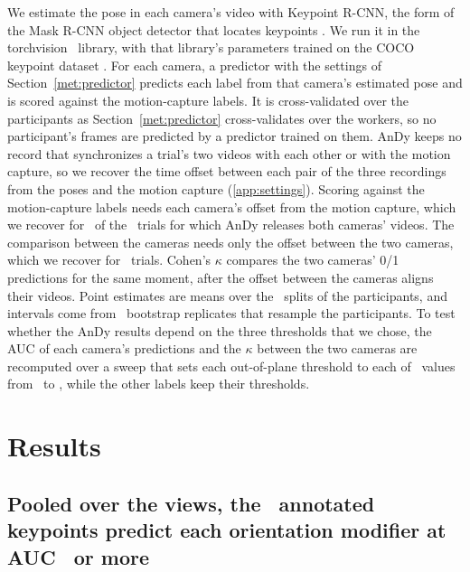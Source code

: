 \documentclass[review,3p,authoryear]{elsarticle}
\begin{document}
We estimate the pose in each camera's video with Keypoint R-CNN, the form of the Mask R-CNN object detector that locates
keypoints \citep{he2017maskrcnn}. We run it in the torchvision \torchvisionVersion\
library, with that library's parameters trained on the COCO keypoint dataset
\citep{lin2014coco}. For each camera, a predictor with the settings of
Section~\ref{met:predictor} predicts each label from that camera's estimated pose and is scored against the
motion-capture labels. It is
cross-validated over the participants as Section~\ref{met:predictor} cross-validates over
the workers, so no participant's frames are predicted by a predictor trained on them. AnDy keeps no record that synchronizes a trial's two videos with each other or with
the motion capture, so we recover the time offset between each pair of the three
recordings from the poses and the motion capture (\ref{app:settings}). Scoring against the motion-capture labels needs each camera's offset from the motion
capture, which we recover for \andyTrialsGt\ of the \andyTrials\ trials for which AnDy releases both cameras'
videos. The
comparison between the cameras needs only the offset between the two cameras, which we
recover for \andyTrialsXview\ trials. Cohen's $\kappa$ compares the two cameras' 0/1
predictions for the same moment, after the offset between the cameras aligns their
videos. Point
estimates are means over the \nSeeds\ splits of the participants, and intervals come from
\nBoot\ bootstrap replicates that resample the participants. To test whether the AnDy
results depend on the three thresholds that we chose, the AUC of each camera's predictions and the $\kappa$ between the two cameras are
recomputed over a sweep that sets each out-of-plane threshold to
each of \andySweepN\ values from \andySweepLo\textdegree\ to \andySweepHi\textdegree,
while the other labels keep their thresholds.

\section{Results}
\label{sec:results}

\subsection{Pooled over the views, the \nKeypoints\ annotated keypoints predict each orientation modifier at AUC \orientMinAuc\ or more}
\label{sec:sameview}
\end{document}

